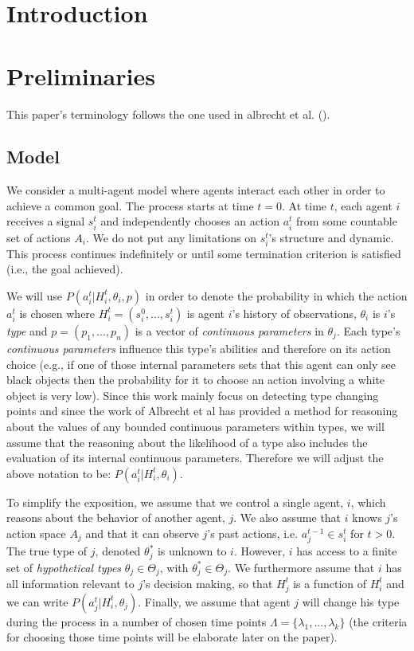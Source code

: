 \documentclass{article}
\newcommand{\typ}{\theta}
\newcommand{\Typ}{\Theta}
\begin{document}

\section{Introduction}

\section{Preliminaries}
This paper's terminology follows the one used in albrecht et al. (\cite{albrecht2017reasoning}).

\subsection{Model}
We consider a multi-agent model where agents interact each other in order to achieve a common goal. The process starts at time $t = 0$. At time $t$, each agent $i$ receives a signal $s_i^t$ and independently chooses an action $a_i^t$ from some countable set of actions $A_i$. We do not put any limitations on $s_i^t$'s structure and dynamic. This process continues indefinitely or until some termination criterion is satisfied (i.e., the goal achieved).

We will use  $P(a_i^t | H_i^t, \typ_i, p)$ in order to denote the probability in which the action $a_i^t$ is chosen where $H_i^t = (s_i^0,...,s_i^t)$ is agent $i$'s history of observations, $\typ_i$ is $i$'s \emph{type} and $p = (p_1,...,p_n)$ is a vector of \emph{continuous parameters} in $\typ_j$. Each type's \emph{continuous parameters} influence this type's abilities and therefore on its action choice (e.g., if one of those internal parameters sets that this agent can only see black objects then the probability for it to choose an action involving a white object is very low). Since this work mainly focus on detecting type changing points and since the work of Albrecht et al has provided a method for reasoning about the values of any bounded continuous parameters within types, we will assume that the reasoning about the likelihood of a type also includes the evaluation of its internal continuous parameters. Therefore we will adjust the above notation to be: $P(a_i^t | H_i^t, \typ_i)$.  

To simplify the exposition, we assume that we control a single agent, $i$, which reasons about the behavior of another agent, $j$. We also assume that $i$ knows $j$'s action space $A_j$ and that it can observe $j$'s past actions, i.e. $a_j^{t-1} \in s_i^t$ for $t > 0$. The true type of $j$, denoted $\typ_j^*$ is unknown to $i$. However, $i$ has access to a finite set of \emph{hypothetical types} $\typ_j \in \Typ_j$, with $\typ_j^* \in \Typ_j$. We furthermore assume that $i$ has all information relevant to $j$'s decision making, so that $H_j^t$ is a function of $H_i^t$ and we can write $P(a_j^t | H_i^t, \typ_j)$. Finally, we assume that agent $j$ will change his type during  the process in a number of chosen time points $\Lambda = \{\lambda_1,...,\lambda_k\}$ (the criteria for choosing those time points will be elaborate later on the paper).
\end{document}

